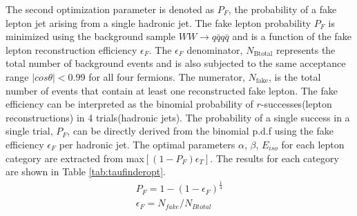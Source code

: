  The second optimization parameter is denoted as $P_F$, the probability of a fake lepton jet arising from a single hadronic jet. The fake lepton probability $P_F$ is minimized using the background sample $WW\rightarrow q\bar{q}q\bar{q}$ and is a function of the fake lepton reconstruction efficiency $\epsilon_F$. The $\epsilon_F$ denominator, $N_{\text{Btotal}}$ represents the total number of background events and is also subjected to the same acceptance range $|cos\theta| < 0.99$ for all four fermions. The numerator, $N_{\text{fake}}$, is the total number of events  that contain at least one reconstructed fake lepton. The fake efficiency can be interpreted as the binomial probability of $r$-successes(lepton reconstructions) in 4 trials(hadronic jets). The probability of a single success in a single trial, $P_F$, can be directly derived from the binomial p.d.f using the fake efficiency $\epsilon_F$ per hadronic jet. The optimal parameters $\alpha$, $\beta$, $E_{iso}$ for each lepton category are extracted from max$[(1-P_F)\epsilon_T]$. The results for each category are shown in Table \ref{tab:taufinderopt}. 
\begin{equation}
\begin{split}
\label{eq:pf}
P_F = 1-(1-\epsilon_F)^{\frac{1}{4}} \\
\epsilon_F = N_{fake}/N_{Btotal}
\end{split}
\end{equation}

  


